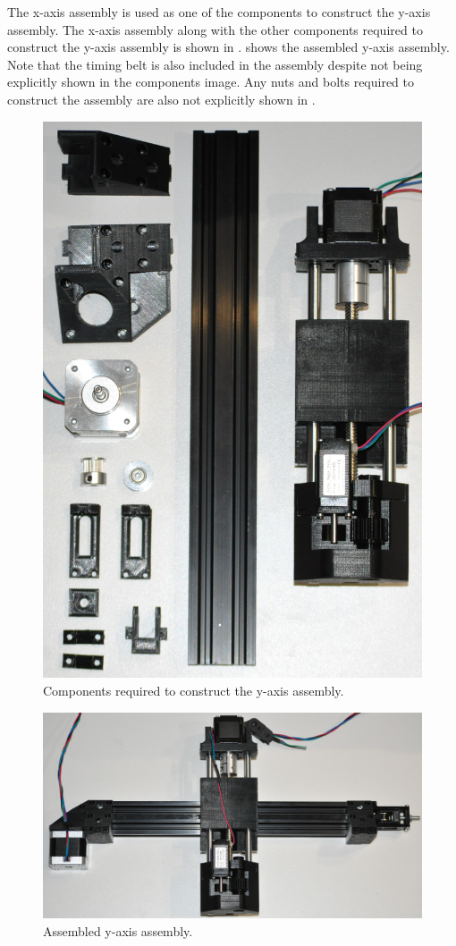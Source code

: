 The x-axis assembly is used as one of the components to construct the y-axis assembly. The x-axis assembly along with the other components required to construct the y-axis assembly is shown in .  shows the assembled y-axis assembly. Note that the timing belt is also included in the assembly despite not being explicitly shown in the components image. Any nuts and bolts required to construct the assembly are also not explicitly shown in .

\begin{figure}[H]
	\centering
	\includegraphics[width=0.4\linewidth]{figures/202108/disassembled-y-axis-assembly.JPG}
	\caption{Components required to construct the y-axis assembly.}
	\label{fig:disassembled-y-axis-assembly}
\end{figure}

\begin{figure}[H]
	\centering
	\includegraphics[width=0.8\linewidth]{figures/202108/assembled-y-axis-assembly.JPG}
	\caption{Assembled y-axis assembly.}
	\label{fig:assembled-y-axis-assembly}
\end{figure}

\pendsign